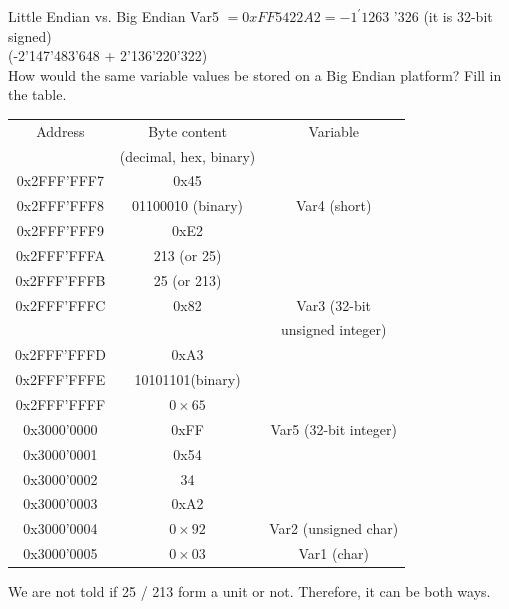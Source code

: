 \begin{example2}{Little Endian vs. Big Endian}
Var5 $=0 x F F 5422 A 2=-1^{\prime} 1263$ '326 (it is 32-bit signed)\\
(-2'147'483'648 + 2'136'220'322)
\vspace{2mm}\\
How would the same variable values be stored on a Big Endian platform? Fill in the table.
\begin{center}
\begin{tabular}{|c|c|c|}
\hline
Address & Byte content & Variable \\
& (decimal, hex, binary) & \\
\hline
0x2FFF'FFF7 & 0x45 &  \\
\hline
0x2FFF'FFF8 & 01100010 (binary) & Var4 (short) \\
\hline
0x2FFF'FFF9 & 0xE2 &  \\
\hline
0x2FFF'FFFA & 213 (or 25) &  \\
\hline
0x2FFF'FFFB & 25 (or 213) &  \\
\hline
0x2FFF'FFFC & 0x82 & Var3 (32-bit  \\
& & unsigned integer) \\
\hline
0x2FFF'FFFD & 0xA3 &  \\
\hline
0x2FFF'FFFE & 10101101(binary) &  \\
\hline
0x2FFF'FFFF & $0 \times 65$ &  \\
\hline
0x3000'0000 & 0xFF & Var5 (32-bit integer) \\
\hline
0x3000'0001 & 0x54 &  \\
\hline
0x3000'0002 & 34 &  \\
\hline
0x3000'0003 & 0xA2 &  \\
\hline
0x3000'0004 & $0 \times 92$ & Var2 (unsigned char) \\
\hline
0x3000'0005 & $0 \times 03$ & Var1 (char) \\
\hline
\end{tabular}
\end{center}
We are not told if 25 / 213 form a unit or not. Therefore, it can be both ways.
\end{example2}



